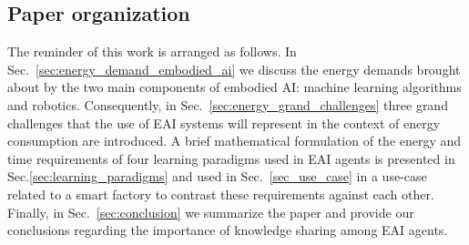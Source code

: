 \subsection{Paper organization}
The reminder of this work is arranged as follows. In Sec.~\ref{sec:energy_demand_embodied_ai} we discuss the energy demands brought about by the two main components of embodied AI: machine learning algorithms and robotics. Consequently, in Sec.~\ref{sec:energy_grand_challenges} three grand challenges that the use of EAI systems will represent in the context of energy consumption are introduced. A brief mathematical formulation of the energy and time requirements of four learning paradigms used in EAI agents is presented in Sec.\ref{sec:learning_paradigms} and used in Sec.~\ref{sec_use_case} in a use-case related to a smart factory to contrast these requirements against each other. Finally, in Sec.~\ref{sec:conclusion} we summarize the paper and provide our conclusions regarding the importance of knowledge sharing among EAI agents. 